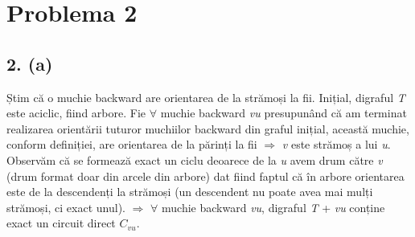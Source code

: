 \documentclass[12pt] {fphw}
\begin{document}
\section*{Problema 2}
\subsection*{2. (a)} 
Știm că o muchie backward are orientarea de la strămoși la fii. Inițial, digraful \textit{T} este aciclic, fiind arbore. Fie $\forall$ muchie backward \textit{vu} presupunând că am terminat realizarea orientării tuturor muchiilor backward din graful inițial, această muchie, conform definiției, are orientarea de la părinți la fii $\Rightarrow$ \textit{v} este strămoș a lui \textit{u}. Observăm că se formează exact un ciclu deoarece de la \textit{u} avem drum către \textit{v} (drum format doar din arcele din arbore) dat fiind faptul că în arbore orientarea este de la descendenți la strămoși (un descendent nu poate avea mai mulți strămoși, ci exact unul). $\Rightarrow$ $\forall$ muchie backward \textit{vu}, digraful \textit{T} + \textit{vu} conține exact un circuit direct \textit{  ${}C_{vu}$}. \\
\\
\\
\\
\\
\end{document}
